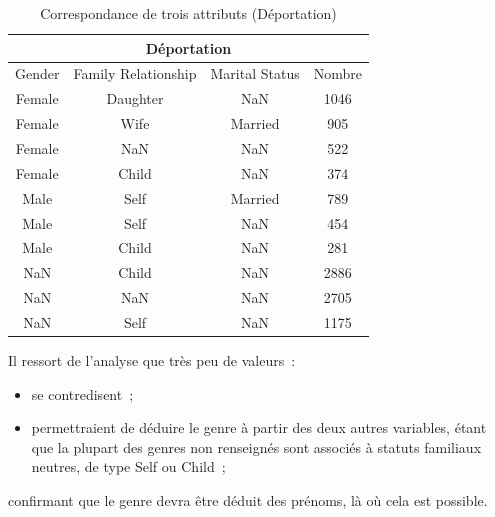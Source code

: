 \documentclass[a4paper,12pt,twoside]{book}
\begin{document}
                \begin{table}[ht]
                \centering
                \renewcommand\cellalign{cl}
                    \begin{tabular}{|c|c|c|c|}
                        \hline
                        \multicolumn{4}{|c|}{Déportation} \\
                        \hline
                        Gender & Family Relationship & Marital Status & Nombre \\\hline
                        Female & Daughter & NaN & 1046 \\
                        Female & Wife & Married & 905 \\
                        Female & NaN & NaN & 522 \\
                        Female & Child & NaN & 374 \\\hline
                        Male & Self & Married & 789 \\
                        Male & Self & NaN & 454 \\
                        Male & Child & NaN & 281 \\\hline
                        NaN & Child & NaN & 2886 \\
                        NaN & NaN & NaN & 2705 \\
                        NaN & Self & NaN & 1175 \\\hline
                    \end{tabular}
                    \caption[Correspondance de trois attributs Déportation]{Correspondance de trois attributs (Déportation)\footnotemark}\label{tab8}
                \end{table}
                
                Il ressort de l'analyse que très peu de valeurs~:
                \begin{itemize}
                    \item se contredisent~;
                    \item permettraient de déduire le genre à partir des deux autres variables, étant que la plupart des genres non renseignés sont associés à statuts familiaux neutres, de type \og{}Self\fg{} ou \og{}Child\fg{}~;
                \end{itemize}
                confirmant que le genre devra être déduit des prénoms, là où cela est possible.
                
\end{document}
